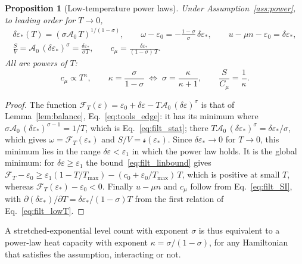 \documentclass[10pt,a4paper]{article}
\theoremstyle{plain}
\newtheorem{proposition}{Proposition}
\newcommand{\cA}{{\mathcal{A}_0}}   %
\newcommand{\Fen}[1][T]{\mathscr{F}_{#1}}  %
\newcommand{\lds}{\mathscr{s}}  %
\newcommand{\Tmax}{T_{\max}}  %
\begin{document}
\begin{proposition}[Low-temperature power laws]\label{prop:power}
Under Assumption~\ref{ass:power}, to leading order for $T\to0$,
\begin{equation}\label{eq:filt_lowT}
\begin{gathered}
  \delta\varepsilon_*(T) = (\sigma\cA\,T)^{1/(1-\sigma)} ,\qquad
  \omega-\varepsilon_0 = -\frac{1-\sigma}{\sigma}\,\delta\varepsilon_* ,\qquad
  u-\mu n-\varepsilon_0=\delta\varepsilon_* ,
  \\
  \frac{S}{V} = \cA\,(\delta\varepsilon_*)^{\sigma}=\frac{\delta\varepsilon_*}{\sigma T} ,\qquad
  c_\mu = \frac{\delta\varepsilon_*}{(1-\sigma)\,T} .
\end{gathered}
\end{equation}
All are powers of $T$:
\begin{equation}\label{eq:filt_powerT}
  c_\mu \propto T^{\kappa} , \qquad
  \kappa = \frac{\sigma}{1-\sigma}
  \;\Longleftrightarrow\;
  \sigma = \frac{\kappa}{\kappa+1} ,
  \qquad
  \frac{S}{C_\mu} = \frac{1}{\kappa} .
\end{equation}
\end{proposition}
\begin{proof}
The function
$\Fen(\varepsilon)=\varepsilon_0+\delta\varepsilon-T\cA\,(\delta\varepsilon)^{\sigma}$
is that of Lemma~\ref{lem:balance}, Eq.~\eqref{eq:tools_edge}: it has its
minimum where $\sigma\cA\,(\delta\varepsilon_*)^{\sigma-1}=1/T$, which is
Eq.~\eqref{eq:filt_stat}; there
$T\cA\,(\delta\varepsilon_*)^{\sigma}=\delta\varepsilon_*/\sigma$, which gives
$\omega=\Fen(\varepsilon_*)$ and $S/V=\lds(\varepsilon_*)$. Since
$\delta\varepsilon_*\to0$ for $T\to0$, this minimum lies in the range
$\delta\varepsilon<\varepsilon_1$ in which the power law holds. It is the
global minimum: for $\delta\varepsilon\ge\varepsilon_1$ the
bound~\eqref{eq:filt_linbound} gives
$\Fen-\varepsilon_0\ge\varepsilon_1(1-T/\Tmax)-(c_0+\varepsilon_0/\Tmax)\,T$,
which is positive at small $T$, whereas
$\Fen(\varepsilon_*)-\varepsilon_0<0$. Finally $u-\mu n$ and $c_\mu$ follow
from Eq.~\eqref{eq:filt_SI}, with
$\partial(\delta\varepsilon_*)/\partial T=\delta\varepsilon_*/(1-\sigma)T$
from the first relation of Eq.~\eqref{eq:filt_lowT}.
\end{proof}
A stretched-exponential level count with exponent $\sigma$ is thus equivalent
to a power-law heat capacity with exponent $\kappa=\sigma/(1-\sigma)$, for
any Hamiltonian that satisfies the assumption, interacting or not.
\end{document}
